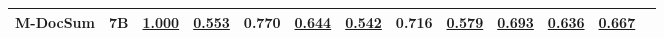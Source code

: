\begin{table*}[tbp]
{\begin{tabular}{lcccccccccccc}
\midrule
\textbf{M-DocSum} & 7B & \textbf{\underline{1.000}} & \underline{0.553} & 0.770 & \underline{0.644} & \underline{0.542} & 0.716 & \textbf{\underline{0.579}} & \underline{0.693} & \underline{0.636} & \textbf{\underline{0.667}} \\

\bottomrule
\end{tabular}
}
\label{tab:main}
\end{table*}